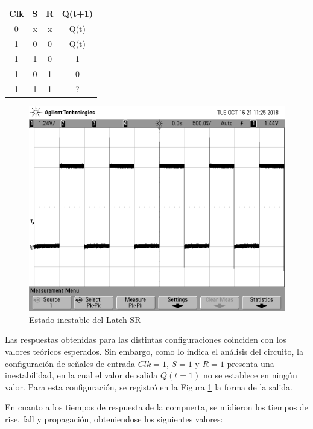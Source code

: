 \begin{center}
\begin{tabular}{ccc|c}
Clk & S & R & Q(t+1) \\ 
\hline 
0 & x & x & Q(t) \\ 
1 & 0 & 0 & Q(t) \\ 
1 & 1 & 0 & 1 \\ 
1 & 0 & 1 & 0 \\ 
1 & 1 & 1 & ? \\
\end{tabular} 
\end{center}

\begin{figure}[H]
\begin{center}
\includegraphics[scale=0.15]{ejercicio6/sr_1.png}
\caption{Estado inestable del Latch SR} \label{6_fig4}
\end{center}
\end{figure}

Las respuestas obtenidas para las distintas configuraciones coinciden con los valores teóricos esperados. Sin embargo, como lo indica el análisis del circuito, la configuración de señales de entrada $Clk=1$, $S=1$ y $R=1$ presenta una inestabilidad, en la cual el valor de salida $Q(t=1)$ no se establece en ningún valor. Para esta configuración, se registró en la Figura \ref{6_fig4} la forma de la salida.

En cuanto a los tiempos de respuesta de la compuerta, se midieron los tiempos de rise, fall y propagación, obteniendose los siguientes valores:

